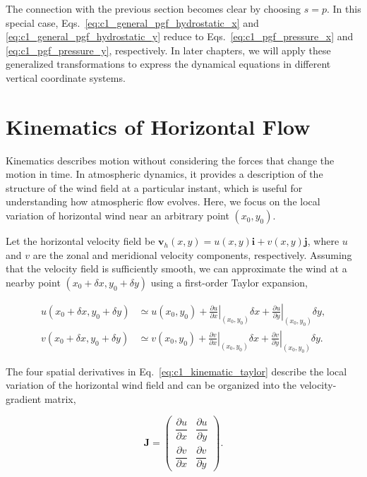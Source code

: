 \documentclass[10pt,twocolumn]{memoir}
\begin{document}
The connection with the previous section becomes clear by choosing $s=p$. In this special case, Eqs.~\ref{eq:c1_general_pgf_hydrostatic_x} and \ref{eq:c1_general_pgf_hydrostatic_y} reduce to Eqs.~\ref{eq:c1_pgf_pressure_x} and \ref{eq:c1_pgf_pressure_y}, respectively. In later chapters, we will apply these generalized transformations to express the dynamical equations in different vertical coordinate systems.

\section{Kinematics of Horizontal Flow}

Kinematics describes motion without considering the forces that change the motion in time. In atmospheric dynamics, it provides a description of the structure of the wind field at a particular instant, which is useful for understanding how atmospheric flow evolves. Here, we focus on the local variation of horizontal wind near an arbitrary point $(x_0,y_0)$.

Let the horizontal velocity field be $\mathbf{v}_h(x,y)=u(x,y)\mathbf{i}+v(x,y)\mathbf{j}$, where $u$ and $v$ are the zonal and meridional velocity components, respectively. Assuming that the velocity field is sufficiently smooth, we can approximate the wind at a nearby point $(x_0+\delta x,y_0+\delta y)$ using a first-order Taylor expansion,

\begin{equation}
\begin{aligned}
    u(x_0+\delta x,y_0+\delta y) &\simeq u(x_0,y_0)+\left.\frac{\partial u}{\partial x}\right|_{(x_0,y_0)}\delta x+\left.\frac{\partial u}{\partial y}\right|_{(x_0,y_0)}\delta y,\\
    v(x_0+\delta x,y_0+\delta y) &\simeq v(x_0,y_0)+\left.\frac{\partial v}{\partial x}\right|_{(x_0,y_0)}\delta x+\left.\frac{\partial v}{\partial y}\right|_{(x_0,y_0)}\delta y.
\end{aligned}
\label{eq:c1_kinematic_taylor}
\end{equation}

The four spatial derivatives in Eq.~\ref{eq:c1_kinematic_taylor} describe the local variation of the horizontal wind field and can be organized into the velocity-gradient matrix,

\begin{equation}
    \mathbf{J}=
    \begin{pmatrix}
        \dfrac{\partial u}{\partial x} & \dfrac{\partial u}{\partial y}\\[6pt]
        \dfrac{\partial v}{\partial x} & \dfrac{\partial v}{\partial y}
    \end{pmatrix}.
\label{eq:c1_velocity_gradient_tensor}
\end{equation}
\end{document}
